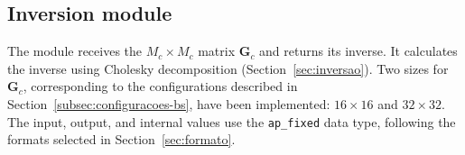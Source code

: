 \subsection{\texorpdfstring{Inversion module}{Inversion module}}\label{subsec:hw-modulo}
The module receives the $M_c \times M_c$ matrix $\mathbf{G}_c$ and returns its inverse. It calculates the inverse using Cholesky decomposition (Section~\ref{sec:inversao}). Two sizes for $\mathbf{G}_c$, corresponding to the configurations described in Section~\ref{subsec:configuracoes-bs}, have been implemented: $16 \times 16$ and $32 \times 32$. The input, output, and internal values use the \texttt{ap\_fixed} data type, following the formats selected in Section~\ref{sec:formato}.


